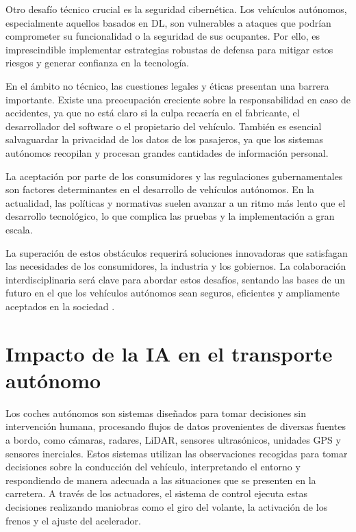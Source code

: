 Otro desafío técnico crucial es la seguridad cibernética. Los vehículos autónomos, especialmente aquellos basados en \ac{DL}, son vulnerables a ataques que podrían comprometer su funcionalidad o la seguridad de sus ocupantes. Por ello, es imprescindible implementar estrategias robustas de defensa para mitigar estos riesgos y generar confianza en la tecnología.

En el ámbito no técnico, las cuestiones legales y éticas presentan una barrera importante. Existe una preocupación creciente sobre la responsabilidad en caso de accidentes, ya que no está claro si la culpa recaería en el fabricante, el desarrollador del software o el propietario del vehículo. También es esencial salvaguardar la privacidad de los datos de los pasajeros, ya que los sistemas autónomos recopilan y procesan grandes cantidades de información personal.

La aceptación por parte de los consumidores y las regulaciones gubernamentales son factores determinantes en el desarrollo de vehículos autónomos. En la actualidad, las políticas y normativas suelen avanzar a un ritmo más lento que el desarrollo tecnológico, lo que complica las pruebas y la implementación a gran escala.

La superación de estos obstáculos requerirá soluciones innovadoras que satisfagan las necesidades de los consumidores, la industria y los gobiernos. La colaboración interdisciplinaria será clave para abordar estos desafíos, sentando las bases de un futuro en el que los vehículos autónomos sean seguros, eficientes y ampliamente aceptados en la sociedad \cite{challenges-autonomous}.

\section{Impacto de la IA en el transporte autónomo}
\label{sec:ia-intro}

Los coches autónomos son sistemas diseñados para tomar decisiones sin intervención humana, procesando flujos de datos provenientes de diversas fuentes a bordo, como cámaras, radares, \ac{LiDAR}, sensores ultrasónicos, unidades \ac{GPS} y sensores inerciales. Estos sistemas utilizan las observaciones recogidas para tomar decisiones sobre la conducción del vehículo, interpretando el entorno y respondiendo de manera adecuada a las situaciones que se presenten en la carretera. A través de los actuadores, el sistema de control ejecuta estas decisiones realizando maniobras como el giro del volante, la activación de los frenos y el ajuste del acelerador.

